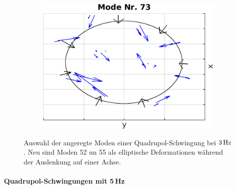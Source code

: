 \documentclass[numbers=noenddot,a4paper,notitlepage,twoside,BCOR15mm]{scrbook}
\begin{document}
\begin{figure}[!t]
\begin{subfigure}[t]{0.325\textwidth}
									\includegraphics[width=\textwidth,height=0.7\textwidth]{figs/auswertung/manipulation/quadrupol3HzModeNr73.png}
								\end{subfigure}
								\caption{Auswahl der angeregte Moden einer Quadrupol-Schwingung bei $\unit[3]{Hz}$. Neu sind Moden 52 un 55 als elliptische Deformationen während der Auslenkung auf einer Achse.}\label{img:modenquadrupol3Hz}
							\end{figure}

					\paragraph{Quadrupol-Schwingungen mit 5\,Hz}
\end{document}
